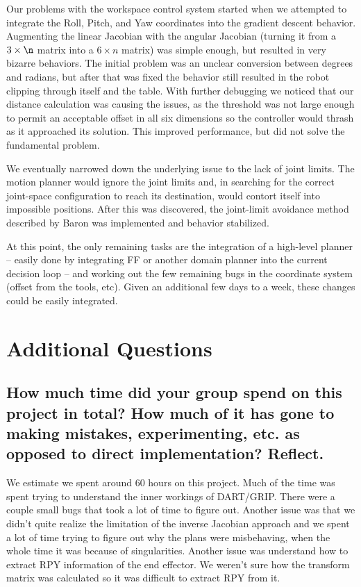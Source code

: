 \documentclass[10pt, conference]{IEEEtran}
\begin{document}
   Our problems with the workspace control system started when we
   attempted to integrate the Roll, Pitch, and Yaw coordinates into the
   gradient descent behavior. Augmenting the linear Jacobian with the
   angular Jacobian (turning it from a \(3 \times \n \) matrix into a
   \(6 \times n \) matrix) was simple enough, but resulted in very
   bizarre behaviors. The initial problem was an unclear conversion
   between degrees and radians, but after that was fixed the behavior
   still resulted in the robot clipping through itself and the
   table. With further debugging we noticed that our distance
   calculation was causing the issues, as the threshold was not large
   enough to permit an acceptable offset in all six dimensions so the
   controller would thrash as it approached its solution. This improved
   performance, but did not solve the fundamental problem.

   We eventually narrowed down the underlying issue to the lack of joint
   limits. The motion planner would ignore the joint limits and, in
   searching for the correct joint-space configuration to reach its
   destination, would contort itself into impossible positions. After
   this was discovered, the joint-limit avoidance method described by
   Baron \cite{luc_baron} was implemented and behavior stabilized.

   At this point, the only remaining tasks are the integration of a
   high-level planner -- easily done by integrating FF or another domain
   planner into the current decision loop -- and working out the few
   remaining bugs in the coordinate system (offset from the tools,
   etc). Given an additional few days to a week, these changes could be
   easily integrated.




\clearpage
\newpage
\appendix
\section{Additional Questions}
\label{sec-7}
\subsection{How much time did your group spend on this project in total? How much of it has gone to making mistakes, experimenting, etc. as opposed to direct implementation? Reflect.}
\label{sec-7-1}

   We estimate we spent around 60 hours on this project. Much of the
   time was spent trying to understand the inner workings of
   DART/GRIP. There were a couple small bugs that took a lot of time to
   figure out. Another issue was that we didn’t quite realize the
   limitation of the inverse Jacobian approach and we spent a lot of
   time trying to figure out why the plans were misbehaving, when the
   whole time it was because of singularities. Another issue was
   understand how to extract RPY information of the end effector. We
   weren’t sure how the transform matrix was calculated so it was
   difficult to extract RPY from it.
\end{document}
